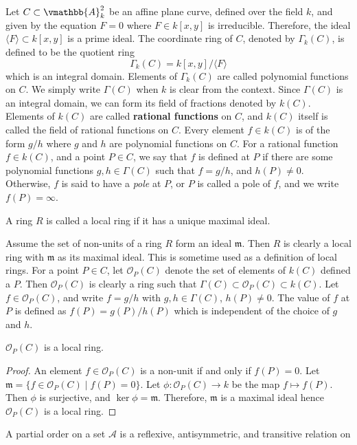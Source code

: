 Let $C \subset \vmathbb{A}_k^2$ be an affine plane curve, defined over the field $k$, and given by 
the equation $F = 0$ where $F \in k[x, y]$ is irreducible. Therefore, the ideal $\langle F \rangle 
\subset k[x, y]$ is a prime ideal. The coordinate ring of $C$, denoted by $\Gamma_k(C)$, is defined 
to be the quotient ring 
$$
\Gamma_k(C) = k[x, y] / \langle F \rangle
$$
which is an integral domain. Elements of $\Gamma_k(C)$ are called polynomial functions on $C$. We 
simply write $\Gamma(C)$ when $k$ is clear from the context. Since $\Gamma(C)$ is an integral 
domain, we can form its field of fractions denoted by $k(C)$. Elements of $k(C)$ are called 
\textbf{rational functions} on $C$, and $k(C)$ itself is called the field of rational functions on 
$C$. Every element $f \in k(C)$ is of the form $g / h$ where $g$ and $h$ are polynomial functions on 
$C$. For a rational function $f \in k(C)$, and a point $P \in C$, we say that $f$ is defined at $P$ 
if there are some polynomial functions $g, h \in \Gamma(C)$ such that $f = g / h$, and $h(P) \ne 0$. 
Otherwise, $f$ is said to have a \textit{pole} at $P$, or $P$ is called a pole of $f$, and we write 
$f(P) = \infty$.
\begin{definition}
A ring $R$ is called a local ring if it has a unique maximal ideal.
\end{definition}
Assume the set of non-units of a ring $R$ form an ideal $\mathfrak{m}$. Then $R$ is clearly a local 
ring with $\mathfrak{m}$ as its maximal ideal. This is sometime used as a definition of local rings. 
For a point $P \in C$, let $\mathcal{O}_P(C)$ denote the set of elements of $k(C)$ defined a $P$. 
Then $\mathcal{O}_P(C)$ is clearly a ring such that $\Gamma(C) \subset \mathcal{O}_P(C) \subset 
k(C)$. Let $f \in \mathcal{O}_P(C)$, and write $f = g / h$ with $g, h \in \Gamma(C)$, $h(P) \ne 0$. 
The value of $f$ at $P$ is defined as $f(P) = g(P) / h(P)$ which is independent of the choice of $g$ 
and $h$.
\begin{lemma}
$\mathcal{O}_P(C)$ is a local ring.
\end{lemma}
\begin{proof}
An element $f \in \mathcal{O}_P(C)$ is a non-unit if and only if $f(P) = 0$. Let $\mathfrak{m} = \{ 
f \in \mathcal{O}_P(C) \mid f(P) = 0\}$. Let $\phi: \mathcal{O}_P(C) \rightarrow k$ be the map $f 
\mapsto f(P)$. Then $\phi$ is surjective, and $\ker \phi = \mathfrak{m}$. Therefore, $\mathfrak{m}$ 
is a maximal ideal hence $\mathcal{O}_P(C)$ is a local ring. 
\end{proof}
A partial order on a set $\mathcal{A}$ is a reflexive, antisymmetric, and transitive relation on 
